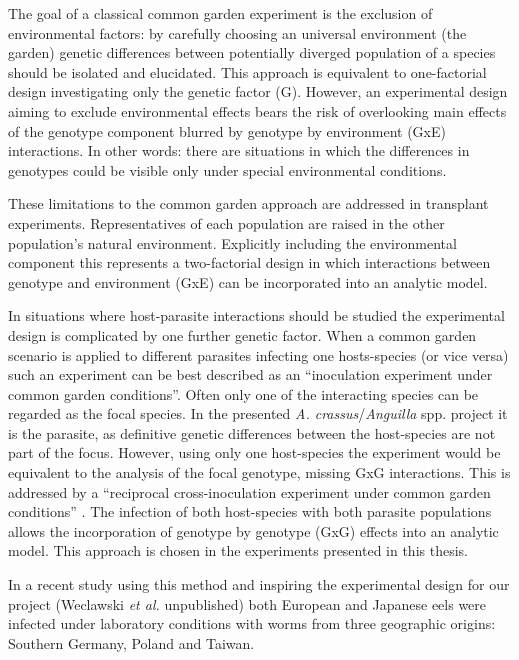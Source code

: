 The goal of a classical common garden experiment is the exclusion of
environmental factors: by carefully choosing an universal environment
(the garden) genetic differences between potentially diverged
population of a species should be isolated and elucidated. This
approach is equivalent to one-factorial design investigating only the
genetic factor (G). However, an experimental design aiming to exclude
environmental effects bears the risk of overlooking main effects of
the genotype component blurred by genotype by environment (GxE)
interactions. In other words: there are situations in which the
differences in genotypes could be visible only under special
environmental conditions.

These limitations to the common garden approach are addressed in
transplant experiments. Representatives of each population are raised
in the other population's natural environment. Explicitly including
the environmental component this represents a two-factorial design in
which interactions between genotype and environment (GxE) can be
incorporated into an analytic model.

In situations where host-parasite interactions should be studied the
experimental design is complicated by one further genetic factor.
When a common garden scenario is applied to different parasites
infecting one hosts-species (or vice versa) such an experiment can be
best described as an ``inoculation experiment under common garden
conditions''. Often only one of the interacting species can be
regarded as the focal species. In the presented
\textit{A. crassus}/\textit{Anguilla} spp. project it is the parasite,
as definitive genetic differences between the host-species are not
part of the focus. However, using only one host-species the experiment
would be equivalent to the analysis of the focal genotype, missing GxG
interactions. This is addressed by a ``reciprocal cross-inoculation
experiment under common garden conditions'' \cite{kaltz_shykoff_rev}.
The infection of both host-species with both parasite populations
allows the incorporation of genotype by genotype (GxG) effects into an
analytic model. This approach is chosen in the experiments presented
in this thesis.

In a recent study using this method and inspiring the experimental
design for our project (Weclawski \textit{et al.} unpublished) both
European and Japanese eels were infected under laboratory conditions
with worms from three geographic origins: Southern Germany, Poland and
Taiwan.


